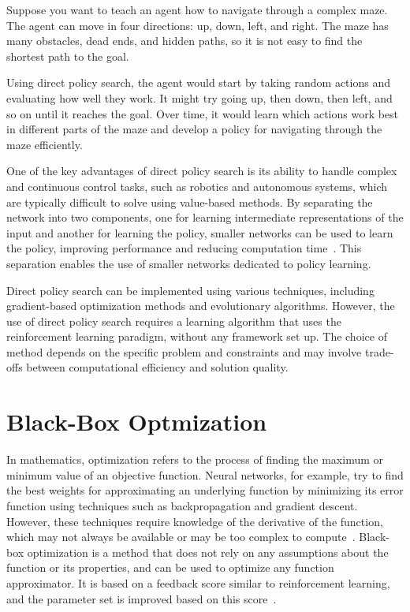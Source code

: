 Suppose you want to teach an agent how to navigate through a complex maze. The agent can move in four directions: up, down, left, and right. The maze has many obstacles, dead ends, and hidden paths, so it is not easy to find the shortest path to the goal.

Using direct policy search, the agent would start by taking random actions and evaluating how well they work. It might try going up, then down, then left, and so on until it reaches the goal. Over time, it would learn which actions work best in different parts of the maze and develop a policy for navigating through the maze efficiently.

One of the key advantages of direct policy search is its ability to handle complex and continuous control tasks, such as robotics and autonomous systems, which are typically difficult to solve using value-based methods. By separating the network into two components, one for learning intermediate representations of the input and another for learning the policy, smaller networks can be used to learn the policy, improving performance and reducing computation time~\cite{cuccu_playing_2019}. This separation enables the use of smaller networks dedicated to policy learning.

Direct policy search can be implemented using various techniques, including gradient-based optimization methods and evolutionary algorithms. However, the use of direct policy search requires a learning algorithm that uses the reinforcement learning paradigm, without any framework set up. The choice of method depends on the specific problem and constraints and may involve trade-offs between computational efficiency and solution quality.

\section{Black-Box Optmization}

In mathematics, optimization refers to the process of finding the maximum or minimum value of an objective function. Neural networks, for example, try to find the best weights for approximating an underlying function by minimizing its error function using techniques such as backpropagation and gradient descent. However, these techniques require knowledge of the derivative of the function, which may not always be available or may be too complex to compute~\cite{schaul_studies_2011}. Black-box optimization is a method that does not rely on any assumptions about the function or its properties, and can be used to optimize any function approximator. It is based on a feedback score similar to reinforcement learning, and the parameter set is improved based on this score~\cite{anderson_introduction_1995}.

